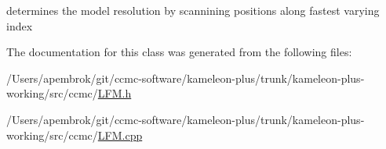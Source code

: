 determines the model resolution by scannining positions along fastest varying index 



The documentation for this class was generated from the following files\-:\begin{DoxyCompactItemize}
\item 
/\-Users/apembrok/git/ccmc-\/software/kameleon-\/plus/trunk/kameleon-\/plus-\/working/src/ccmc/\hyperlink{_l_f_m_8h}{L\-F\-M.\-h}\item 
/\-Users/apembrok/git/ccmc-\/software/kameleon-\/plus/trunk/kameleon-\/plus-\/working/src/ccmc/\hyperlink{_l_f_m_8cpp}{L\-F\-M.\-cpp}\end{DoxyCompactItemize}

